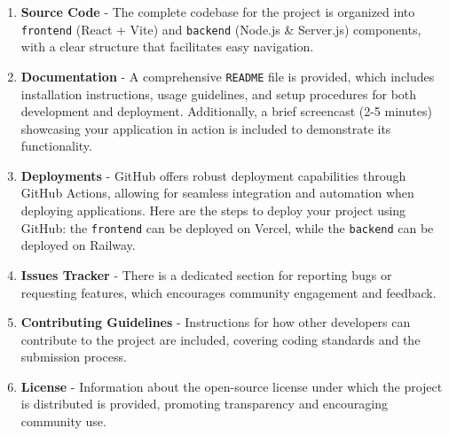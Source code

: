 \begin{enumerate}
    \item \textbf{Source Code} - The complete codebase for the project is organized into \texttt{frontend} (React + Vite) and \texttt{backend} (Node.js \& Server.js) components, with a clear structure that facilitates easy navigation.
    \item \textbf{Documentation} - A comprehensive \texttt{README} file is provided, which includes installation instructions, usage guidelines, and setup procedures for both development and deployment. Additionally, a brief screencast (2-5 minutes) showcasing your application in action is included to demonstrate its functionality.
    \item \textbf{Deployments} - GitHub offers robust deployment capabilities through GitHub Actions, allowing for seamless integration and automation when deploying applications. Here are the steps to deploy your project using GitHub: the \texttt{frontend} can be deployed on Vercel, while the \texttt{backend} can be deployed on Railway.
    \item \textbf{Issues Tracker} - There is a dedicated section for reporting bugs or requesting features, which encourages community engagement and feedback.
    \item \textbf{Contributing Guidelines} - Instructions for how other developers can contribute to the project are included, covering coding standards and the submission process.
    \item \textbf{License} - Information about the open-source license under which the project is distributed is provided, promoting transparency and encouraging community use.
\end{enumerate}